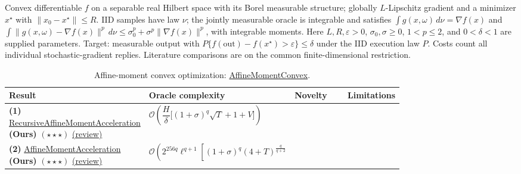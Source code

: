 \begin{table}[tp]
\centering
\caption{Affine-moment convex optimization: \href{https://github.com/k3nfalt/longtails/blob/main/LongTails/Setups/AffineMomentConvex.lean}{AffineMomentConvex}.}\label{tab:AffineMomentConvex}
\parbox{\linewidth}{\footnotesize Convex differentiable $f$ on a separable real Hilbert space with its Borel measurable structure; globally $L$-Lipschitz gradient and a minimizer $x^\star$ with $\|x_0-x^\star\|\le R$. IID samples have law $\nu$; the jointly measurable oracle is integrable and satisfies $\int g(x,\omega)\,d\nu=\nabla f(x)$ and $\int\|g(x,\omega)-\nabla f(x)\|^p\,d\nu\le\sigma_0^p+\sigma^p\|\nabla f(x)\|^p$, with integrable moments. Here $L,R,\varepsilon>0$, $\sigma_0,\sigma\ge0$, $1<p\le2$, and $0<\delta<1$ are supplied parameters. Target: measurable output with $P\{f(\mathrm{out})-f(x^\star)>\varepsilon\}\le\delta$ under the IID execution law $P$. Costs count all individual stochastic-gradient replies. Literature comparisons are on the common finite-dimensional restriction.}\par\smallskip
\begin{threeparttable}
\footnotesize
\setlength{\tabcolsep}{4pt}\renewcommand{\arraystretch}{1.25}
\begin{tabularx}{\linewidth}{@{}>{\raggedright\arraybackslash}p{0.20\linewidth}>{\raggedright\arraybackslash}p{0.32\linewidth}>{\raggedright\arraybackslash}p{0.25\linewidth}>{\raggedright\arraybackslash}X@{}}
\toprule
\textbf{Result} & \textbf{Oracle complexity} & \textbf{Novelty} & \textbf{Limitations} \\
\midrule
\textbf{(1)} \href{https://github.com/k3nfalt/longtails/blob/main/LongTails/Theorems/RecursiveAffineMomentAcceleration.lean}{Recursive\allowbreak Affine\allowbreak Moment\allowbreak Acceleration} \textbf{(Ours)} $(\star\star\star)$ \href{https://github.com/k3nfalt/longtails/blob/main/scripts/reviews/RecursiveAffineMomentAcceleration.md}{(review)}
& $\mathcal{O}\!\left(\dfrac{H}{\delta}\big[(1+\sigma)^q\sqrt T+1+V\big]\right)$ & & \\
\midrule
\textbf{(2)} \href{https://github.com/k3nfalt/longtails/blob/main/LongTails/Theorems/AffineMomentAcceleration.lean}{Affine\allowbreak Moment\allowbreak Acceleration} \textbf{(Ours)} $(\star\star\star)$ \href{https://github.com/k3nfalt/longtails/blob/main/scripts/reviews/AffineMomentAcceleration.md}{(review)}
& $\displaystyle\mathcal{O}\!\left(2^{256q}\ell^{q+1}\left[(1+\sigma)^q(4+T)^{\frac{q}{q+2}}\right.\right.$\par

\end{tabularx}
\end{threeparttable}
\end{table}
